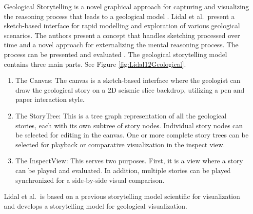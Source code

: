 \documentclass{egpubl}
\begin{document}
Geological Storytelling is a novel graphical approach for capturing and visualizing the reasoning process that leads to a geological model \cite{lidal} \cite{Lidal2013}.
Lidal et al.\ present a sketch-based interface for rapid modelling and exploration of various geological scenarios. The authors present a concept that handles sketching processed over time and a novel approach for externalizing the mental reasoning process. The process can be presented and evaluated \cite{lidal}\cite{Lidal2013}.
The geological storytelling model contains three main parts. See Figure \ref{fig:Lidal12Geological}.
\begin{enumerate}
\item The Canvas: The canvas is a sketch-based interface where the geologist can draw the geological story on a 2D seismic slice
backdrop, utilizing a pen and paper interaction style.
\item The StoryTree: This is a tree graph representation of all the geological stories, each with its own subtree of story nodes. Individual story nodes can be selected for editing in the canvas. One or more complete story trees can be selected for playback or comparative visualization in the inspect view.

\item The InspectView: This serves two purposes. First, it is a view where a story can be played and evaluated. In addition,
multiple stories can be played synchronized for a side-by-side visual comparison.

\end{enumerate}
Lidal et al.\ is based on a previous storytelling model \cite{wohlfat} scientific for visualization \cite{sci} and develops a storytelling model for geological visualization.
\end{document}
